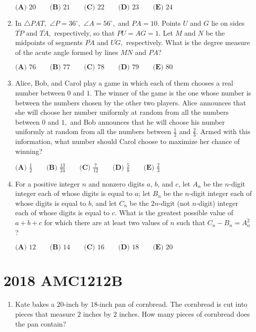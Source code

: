 \documentclass{article}
\begin{document}
\begin{enumerate}[label=\arabic*., itemsep=0.5em]
\(\textbf{(A) } 20 \qquad 
\textbf{(B) } 21 \qquad 
\textbf{(C) } 22 \qquad 
\textbf{(D) } 23 \qquad 
\textbf{(E) } 24 \)\par \vspace{0.5em}\item In \(\triangle PAT,\) \(\angle P=36^{\circ},\) \(\angle A=56^{\circ},\) and \(PA=10.\) Points \(U\) and \(G\) lie on sides \(\overline{TP}\) and \(\overline{TA},\) respectively, so that \(PU=AG=1.\) Let \(M\) and \(N\) be the midpoints of segments \(\overline{PA}\) and \(\overline{UG},\) respectively. What is the degree measure of the acute angle formed by lines \(MN\) and \(PA?\)

\(\textbf{(A) } 76 \qquad 
\textbf{(B) } 77 \qquad 
\textbf{(C) } 78 \qquad 
\textbf{(D) } 79 \qquad 
\textbf{(E) } 80 \)\par \vspace{0.5em}\item Alice, Bob, and Carol play a game in which each of them chooses a real number between \(0\) and \(1.\) The winner of the game is the one whose number is between the numbers chosen by the other two players. Alice announces that she will choose her number uniformly at random from all the numbers between \(0\) and \(1,\) and Bob announces that he will choose his number uniformly at random from all the numbers between \(\tfrac{1}{2}\) and \(\tfrac{2}{3}.\) Armed with this information, what number should Carol choose to maximize her chance of winning?

\(
\textbf{(A) }\frac{1}{2}\qquad
\textbf{(B) }\frac{13}{24} \qquad
\textbf{(C) }\frac{7}{12} \qquad
\textbf{(D) }\frac{5}{8} \qquad
\textbf{(E) }\frac{2}{3}\qquad
\)\par \vspace{0.5em}\item For a positive integer \(n\) and nonzero digits \(a\), \(b\), and \(c\), let \(A_n\) be the \(n\)-digit integer each of whose digits is equal to \(a\); let \(B_n\) be the \(n\)-digit integer each of whose digits is equal to \(b\), and let \(C_n\) be the \(2n\)-digit (not \(n\)-digit) integer each of whose digits is equal to \(c\). What is the greatest possible value of \(a + b + c\) for which there are at least two values of \(n\) such that \(C_n - B_n = A_n^2\)?

\(\textbf{(A) } 12 \qquad \textbf{(B) } 14 \qquad \textbf{(C) } 16 \qquad \textbf{(D) } 18 \qquad \textbf{(E) } 20\)\par \vspace{0.5em}\end{enumerate}\newpage\section*{2018 AMC1212B}\begin{enumerate}[label=\arabic*., itemsep=0.5em]\item Kate bakes a \(20\)-inch by \(18\)-inch pan of cornbread. The cornbread is cut into pieces that measure \(2\) inches by \(2\) inches. How many pieces of cornbread does the pan contain?


\end{enumerate}
\end{document}
